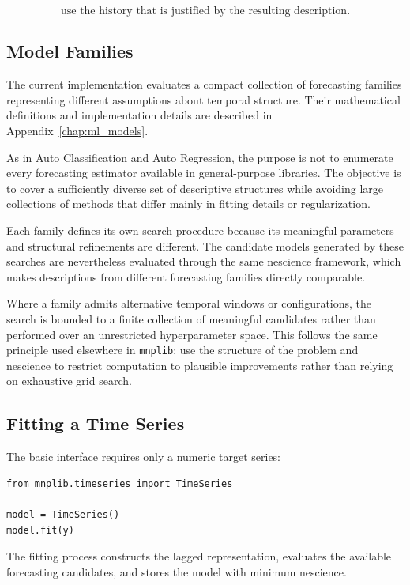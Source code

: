 \[
\text{use the history that is justified by the resulting description}.
\]

\subsection*{Model Families}

The current implementation evaluates a compact collection of forecasting
families representing different assumptions about temporal structure. Their
mathematical definitions and implementation details are described in
Appendix~\ref{chap:ml_models}.

As in Auto Classification and Auto Regression, the purpose is not to enumerate
every forecasting estimator available in general-purpose libraries. The objective
is to cover a sufficiently diverse set of descriptive structures while avoiding
large collections of methods that differ mainly in fitting details or
regularization.

Each family defines its own search procedure because its meaningful parameters
and structural refinements are different. The candidate models generated by
these searches are nevertheless evaluated through the same nescience framework,
which makes descriptions from different forecasting families directly
comparable.

Where a family admits alternative temporal windows or configurations, the
search is bounded to a finite collection of meaningful candidates rather than
performed over an unrestricted hyperparameter space. This follows the same
principle used elsewhere in \texttt{mnplib}: use the structure of the problem and
nescience to restrict computation to plausible improvements rather than relying
on exhaustive grid search.

\subsection*{Fitting a Time Series}

The basic interface requires only a numeric target series:

\begin{sourcecode}
{\scriptsize
\begin{verbatim}
from mnplib.timeseries import TimeSeries

model = TimeSeries()
model.fit(y)
\end{verbatim}}
\end{sourcecode}

The fitting process constructs the lagged representation, evaluates the available
forecasting candidates, and stores the model with minimum nescience.

